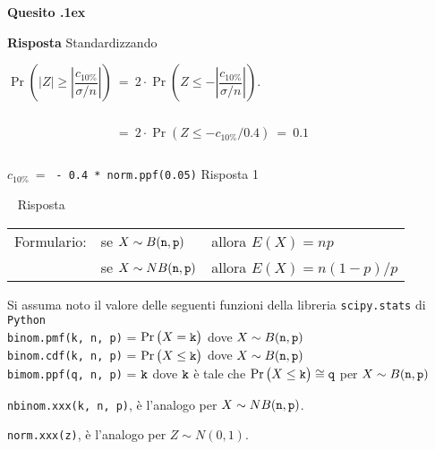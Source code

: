 \documentclass[11pt,twoside,a4paper]{article}
\newcounter{quesito}
\newenvironment{question}{\addtocounter{quesito}{1}\par\textbf{Quesito \thequesito.\kern1ex}}{\vspace{0.5\parskip}}
\newenvironment{answer}{\par\textbf{Risposta\quad}}{\vspace{\parskip}}
\begin{document}
\begin{question}
\begin{answer}
Standardizzando

$\Pr\left(|Z|\ge \left|\dfrac{c_{10\%}}{\sigma/n}\right|\right)
\ =\ 
2\cdot\Pr\left(Z\le -\left|\dfrac{c_{10\%}}{\sigma/n}\right|\right)$.

$\phantom{\Pr\left(|Z|\ge \left|\dfrac{c_{10\%}}{\sigma/n}\right|\right)}
\ =\ 
2 \cdot \Pr\left(Z\le-c_{10\%}/0.4\right)
\ =\ 
0.1$

$c_{10\%}
\ =\ $
{\tt - 0.4 * norm.ppf(0.05)}\hfill{\color{blue} Risposta 1}



{\tt {\color{blue}   }}\hfill{\color{blue} Risposta} 
\end{answer}
\end{question}


\vfill\hrulefill\par
\begin{tabular}{@{}lll}
Formulario:& se $X\sim B({\tt n},{\tt p})$ & allora $E(X)=np$\\
           & se $X\sim NB({\tt n},{\tt p})$& allora $E(X)=n(1-p)/p$
\end{tabular}

Si assuma noto il valore delle seguenti funzioni della libreria {\tt scipy.stats\/} di  {\tt Python\/}\\
{\tt binom.pmf(k, n, p)} = $\Pr\big(X={\tt k}\big)$ dove $X\sim B({\tt n},{\tt p})$\\
{\tt binom.cdf(k, n, p)} = $\Pr\big(X\le{\tt k}\big)$ dove  $X\sim B({\tt n},{\tt p})$ \\
{\tt bimom.ppf(q, n, p)} = ${\tt k}$ dove ${\tt k}$ è tale che $\Pr\big(X\le{\tt k}\big)\cong{\tt q}$ per $X\sim B({\tt n},{\tt p})$ 

{\tt nbinom.xxx(k, n, p)}, è l'analogo per $X\sim NB({\tt n},{\tt p})$.

{\tt norm.xxx(z)}, è l'analogo per $Z\sim N(0,1)$.
\end{document}

